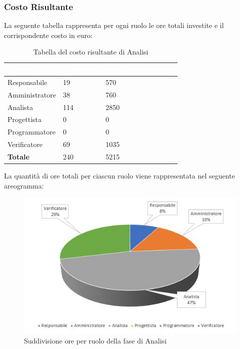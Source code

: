 \clearpage
\subsubsection{Costo Risultante}
La seguente tabella rappresenta per ogni ruolo le ore totali investite e il corrispondente costo in euro:
{
\renewcommand{\arraystretch}{2}
\centering

\begin{longtable}{ C{3cm} C{2cm} C{4cm}}
\caption{Tabella del costo risultante di Analisi}\\
	\textcolor{white}{\textbf{Ruolo}} & 
	\textcolor{white}{\textbf{Totale ore}} & 
	\textcolor{white}{\textbf{Costo ruolo in euro}}\\	
\endhead

        Responsabile & 19 & 570\\
        Amministratore & 38 & 760\\
        Analista & 114 & 2850 \\
        Progettista & 0 & 0 \\
        Programmatore & 0 & 0 \\
        Verificatore & 69 & 1035 \\
        \textbf{Totale} & 240 & 5215 \\
		
	\end{longtable}

}


La quantità di ore totali per ciascun ruolo viene rappresentata nel seguente areogramma:
\begin{figure}[h]
\centering	
	\includegraphics[scale=3.0]{Sezioni/Aerogrammi/AerogrammaAnalisi.png}
	\caption{Suddivisione ore per ruolo della fase di Analisi}
\end{figure}
\clearpage

